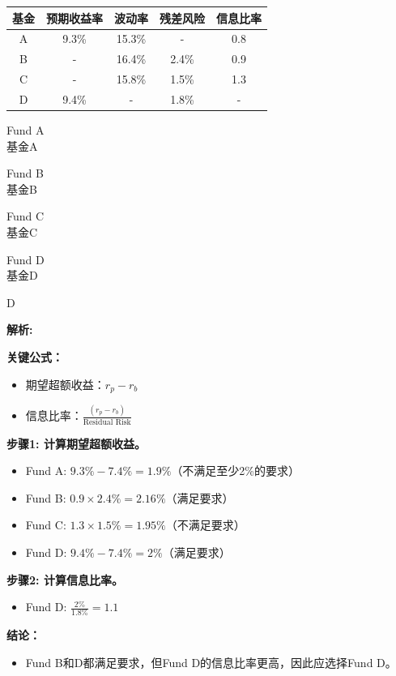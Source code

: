 \documentclass{article}
\newenvironment{explanation}
{\textbf{解析:}\par}
{\par}
\begin{document}
\begin{table}[H]
\centering
\begin{tabular}{|c|c|c|c|c|}
    \hline
    基金 & 预期收益率 & 波动率 & 残差风险 & 信息比率 \\
    \hline
    A & 9.3\% & 15.3\% & - & 0.8 \\
    \hline
    B & - & 16.4\% & 2.4\% & 0.9 \\
    \hline
    C & - & 15.8\% & 1.5\% & 1.3 \\
    \hline
    D & 9.4\% & - & 1.8\% & - \\
    \hline
\end{tabular}
\end{table}

\begin{choices}
    \item Fund A\\
    基金A
    \item Fund B\\
    基金B
    \item Fund C\\
    基金C
    \item Fund D\\
    基金D
\end{choices}

\begin{correctanswer}
    D
\end{correctanswer}

\begin{explanation}
    \textbf{关键公式：}
    \begin{itemize}
        \item 期望超额收益：\(r_p - r_b\)
        \item 信息比率：\(\frac{(r_p - r_b)}{\text{Residual Risk}}\)
    \end{itemize}

    \textbf{步骤1: 计算期望超额收益。}
    \begin{itemize}
        \item Fund A: \(9.3\% - 7.4\% = 1.9\%\)（不满足至少2\%的要求）
        \item Fund B: \(0.9 \times 2.4\% = 2.16\%\)（满足要求）
        \item Fund C: \(1.3 \times 1.5\% = 1.95\%\)（不满足要求）
        \item Fund D: \(9.4\% - 7.4\% = 2\%\)（满足要求）
    \end{itemize}

    \textbf{步骤2: 计算信息比率。}
    \begin{itemize}
        \item Fund D: \(\frac{2\%}{1.8\%} = 1.1\)
    \end{itemize}

    \textbf{结论：}
    \begin{itemize}
        \item Fund B和D都满足要求，但Fund D的信息比率更高，因此应选择Fund D。
    \end{itemize}
\end{explanation}
\end{document}
